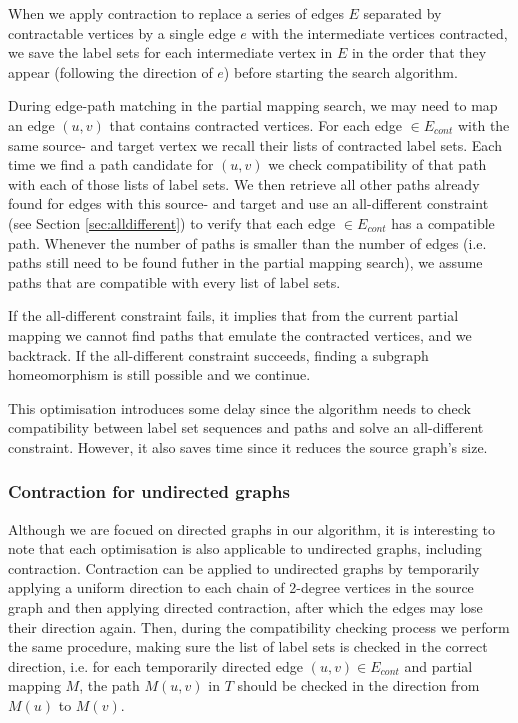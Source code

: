 When we apply contraction to replace a series of edges $E$ separated by contractable vertices by a single edge $e$ with the intermediate vertices contracted, we save the label sets for each intermediate vertex in $E$ in the order that they appear (following the direction of $e$) before starting the search algorithm. 

During edge-path matching in the partial mapping search, we may need to map an edge $(u, v)$ that contains contracted vertices. For each edge $\in E_{cont}$ with the same source- and target vertex we recall their lists of contracted label sets. Each time we find a path candidate for $(u, v)$ we check compatibility of that path with each of those lists of label sets. We then retrieve all other paths already found for edges with this source- and target and use an all-different constraint (see Section \ref{sec:alldifferent}) to verify that each edge $\in E_{cont}$ has a compatible path. Whenever the number of paths is smaller than the number of edges (i.e. paths still need to be found futher in the partial mapping search), we assume paths that are compatible with every list of label sets.

If the all-different constraint fails, it implies that from the current partial mapping we cannot find paths that emulate the contracted vertices, and we backtrack. If the all-different constraint succeeds, finding a subgraph homeomorphism is still possible and we continue.

This optimisation introduces some delay since the algorithm needs to check compatibility between label set sequences and paths and solve an all-different constraint. However, it also saves time since it reduces the source graph's size. 

\subsubsection{Contraction for undirected graphs}
Although we are focued on directed graphs in our algorithm, it is interesting to note that each optimisation is also applicable to undirected graphs, including contraction. Contraction can be applied to undirected graphs by temporarily applying a uniform direction to each chain of 2-degree vertices in the source graph and then applying directed contraction, after which the edges may lose their direction again. Then, during the compatibility checking process we perform the same procedure, making sure the list of label sets is checked in the correct direction, i.e. for each temporarily directed edge $(u, v) \in E_{cont}$ and partial mapping $M$, the path $M(u, v)$ in $T$ should be checked in the direction from $M(u)$ to $M(v)$.

